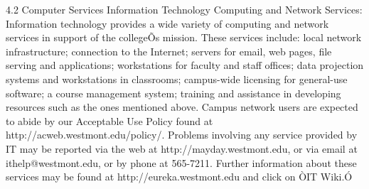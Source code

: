 \documentclass[letterpaper, 11pt]{article}
\begin{document}
4.2 Computer Services
   Information Technology Computing and Network Services:  Information technology provides a wide variety of computing and network services in support of the collegeÕs mission.  These services include:  local network infrastructure; connection to the Internet; servers for email, web pages, file serving and applications; workstations for faculty and staff offices; data projection systems and workstations in classrooms; campus-wide licensing for general-use software; a course management system; training and assistance in developing resources such as the ones mentioned above.
   Campus network users are expected to abide by our Acceptable Use Policy found at http://acweb.westmont.edu/policy/.  Problems involving any service provided by IT may be reported via the web at http://mayday.westmont.edu, or via email at ithelp@westmont.edu, or by phone at 565-7211.  Further information about these services may be found at http://eureka.westmont.edu and click on ÒIT Wiki.Ó
\end{document}
